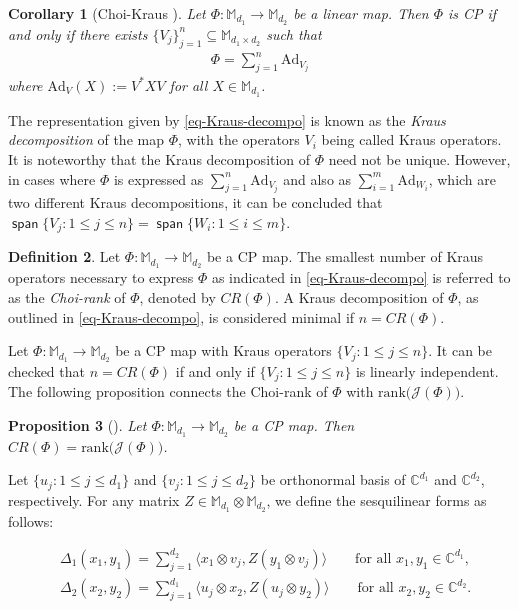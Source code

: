 \documentclass[10pt,reqno]{amsart}
\theoremstyle{definition}
\newtheorem{defn}{Definition}[section]
\theoremstyle{plain}
\newtheorem{prop}[defn]{Proposition}
\newtheorem{cor}[defn]{Corollary}
\theoremstyle{remark}
\renewcommand{\sf}[1]{\textsf{#1}}
\newcommand{\mbb}[1]{\mathbb{#1}}
\newcommand{\msc}[1]{\mathscr{#1}}
\newcommand{\M}[1]{\mbb{M}_{#1}}%
\newcommand{\ip}[1]{\langle#1\rangle}
\DeclareMathOperator{\lspan}{\sf{span}}
\numberwithin{equation}{section}%
\begin{document}
\begin{cor}[Choi-Kraus \cite{Cho75,Kra71}]\label{cor-choi-kraus-rep}
	Let $\Phi:\M{d_1}\to\M{d_2}$ be a linear map. Then $\Phi$ is CP if and only if there exists $\{V_j\}_{j=1}^n\subseteq\M{d_1\times d_2}$ such that  
	\begin{align}\label{eq-Kraus-decompo}
		\Phi=\sum_{j=1}^n\mathrm{Ad}_{V_j}
	\end{align}
	where $\mathrm{Ad}_V(X):=V^*XV$ for all $X\in\M{d_1}$.
\end{cor}



The representation given by \eqref{eq-Kraus-decompo} is known as the \emph{Kraus decomposition} of the map $\Phi$, with the operators $V_i$ being called Kraus operators. It is noteworthy that the Kraus decomposition of $\Phi$ need not be unique. However, in cases where $\Phi$ is expressed as $\sum_{j=1}^n\mathrm{Ad}_{V_j}$ and also as $\sum_{i=1}^m\mathrm{Ad}_{W_i}$, which are two different Kraus decompositions, it can be concluded that $\lspan\{V_j:1\leq j\leq n\}=\lspan\{W_i: 1\leq i\leq m\}$.



\begin{defn}
	Let $\Phi:\M{d_1}\to\M{d_2}$ be a CP map. The smallest number of Kraus operators necessary to express $\Phi$ as indicated in \eqref{eq-Kraus-decompo} is referred to as the \emph{Choi-rank} of $\Phi$, denoted by $CR(\Phi)$. A Kraus decomposition of $\Phi$, as outlined in \eqref{eq-Kraus-decompo}, is considered minimal if $n=CR(\Phi)$.
\end{defn}  


Let $\Phi:\M{d_1}\to\M{d_2}$ be a CP map with Kraus operators $\{V_j:1\leq j\leq n\}$. It can be checked that $n=CR(\Phi)$ if and only if $\{V_j:1\leq j\leq n\}$ is linearly independent. The following proposition connects the Choi-rank of $\Phi$ with $\mbox{rank}\big(\msc{J}(\Phi)\big)$.

\begin{prop}[\cite{Cho75}]\label{prop-choi-rank}
	Let $\Phi:\M{d_1}\to\M{d_2}$ be a CP map. Then $CR(\Phi)=\mbox{rank}\big(\msc{J}(\Phi)\big)$.
\end{prop}



Let $\{u_j:1\leq j\leq d_1\}$ and $\{v_j:1\leq j\leq d_2\}$ be orthonormal basis of $\mbb{C}^{d_1}$ and $\mbb{C}^{d_2}$, respectively. For any matrix $Z\in\M{d_1}\otimes\M{d_2}$, we define the sesquilinear forms as follows:

\begin{align*}
	&\Delta_1(x_1,y_1)=\sum_{j=1}^{d_2}\ip{x_1\otimes v_j, Z(y_1\otimes v_j)} \qquad \text{for all } x_1,y_1\in\mbb{C}^{d_1},\\
	&\Delta_2(x_2,y_2)=\sum_{j=1}^{d_1}\ip{u_j\otimes x_2, Z(u_j\otimes y_2)}\qquad \text{for all } x_2,y_2\in\mbb{C}^{d_2}.
\end{align*}
\end{document}
